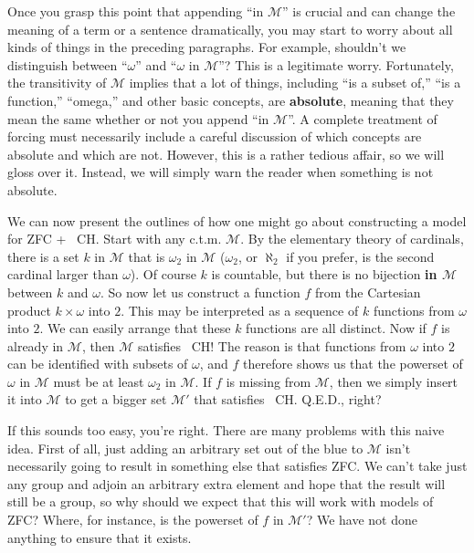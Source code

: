 \documentclass[10pt]{article}
\newcommand\axiom[1]{\textmd{#1}}
\theoremstyle{definition}
\begin{document}
Once you grasp this point that appending ``in $\mathcal M$'' is crucial and can change the meaning of a term or a sentence dramatically, you may start to worry about all kinds of things in the preceding paragraphs. For example, shouldn't we distinguish between ``$\omega$'' and ``$\omega$ in $\mathcal M$''? This is a legitimate worry. Fortunately, the transitivity of $\mathcal M$ implies that a lot of things, including ``is a subset of,'' ``is a function,'' ``omega,'' and other basic concepts, are \textbf{absolute}, meaning that they mean the same whether or not you append ``in $\mathcal M$''. A complete treatment of forcing must necessarily include a careful discussion of which concepts are absolute and which are not. However, this is a rather tedious affair, so we will gloss over it. Instead, we will simply warn the reader when something is not absolute.

We can now present the outlines of how one might go about constructing a model for \axiom{ZFC} + \axiom{~CH}. Start with any c.t.m. $\mathcal M$. By the elementary theory of cardinals, there is a set $k$ in $\mathcal M$ that is $\omega_2$ in $\mathcal M$ ($\omega_2$, or $\aleph_2$ if you prefer, is the second cardinal larger than $\omega$). Of course $k$ is countable, but there is no bijection \textbf{in $\mathcal M$} between $k$ and $\omega$. So now let us construct a function $f$ from the Cartesian product $k \times \omega$ into $2$. This may be interpreted as a sequence of $k$ functions from $\omega$ into $2$. We can easily arrange that these $k$ functions are all distinct. Now if $f$ is already in $\mathcal M$, then $\mathcal M$ satisfies \axiom{~CH}! The reason is that functions from $\omega$ into $2$ can be identified with subsets of $\omega$, and $f$ therefore shows us that the powerset of $\omega$ in $\mathcal M$ must be at least $\omega_2$ in $\mathcal M$. If $f$ is missing from $\mathcal M$, then we simply insert it into $\mathcal M$ to get a bigger set $\mathcal{M'}$ that satisfies \axiom{~CH}. Q.E.D., right?

If this sounds too easy, you're right. There are many problems with this naive idea. First of all, just adding an arbitrary set out of the blue to $\mathcal M$ isn't necessarily going to result in something else that satisfies \axiom{ZFC}. We can't take just any group and adjoin an arbitrary extra element and hope that the result will still be a group, so why should we expect that this will work with models of \axiom{ZFC}? Where, for instance, is the powerset of $f$ in $\mathcal{M'}$? We have not done anything to ensure that it exists.
\end{document}
